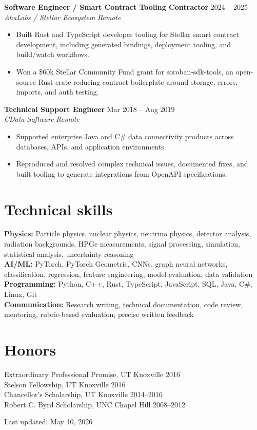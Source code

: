 \documentclass[10pt,letterpaper]{article}
\newcommand{\role}[4]{%
  \textbf{#1} \hfill #2\\
  \textit{#3} \hfill \textit{#4}\\[-2pt]
}
\begin{document}
\role{Software Engineer / Smart Contract Tooling Contractor}{2024 -- 2025}{AhaLabs / Stellar Ecosystem}{Remote}
\begin{itemize}
  \item Built Rust and TypeScript developer tooling for Stellar smart contract development, including generated bindings, deployment tooling, and build/watch workflows.
  \item Won a \$60k Stellar Community Fund grant for soroban-sdk-tools, an open-source Rust crate reducing contract boilerplate around storage, errors, imports, and auth testing.
\end{itemize}

\role{Technical Support Engineer}{Mar 2018 -- Aug 2019}{CData Software}{Remote}
\begin{itemize}
  \item Supported enterprise Java and C\# data connectivity products across databases, APIs, and application environments.
  \item Reproduced and resolved complex technical issues, documented fixes, and built tooling to generate integrations from OpenAPI specifications.
\end{itemize}

\section*{Technical skills}
\textbf{Physics:} Particle physics, nuclear physics, neutrino physics, detector analysis, radiation backgrounds, HPGe measurements, signal processing, simulation, statistical analysis, uncertainty reasoning\\
\textbf{AI/ML:} PyTorch, PyTorch Geometric, CNNs, graph neural networks, classification, regression, feature engineering, model evaluation, data validation\\
\textbf{Programming:} Python, C++, Rust, TypeScript, JavaScript, SQL, Java, C\#, Linux, Git\\
\textbf{Communication:} Research writing, technical documentation, code review, mentoring, rubric-based evaluation, precise written feedback

\section*{Honors}
Extraordinary Professional Promise, UT Knoxville \hfill 2016\\
Stelson Fellowship, UT Knoxville \hfill 2016\\
Chancellor's Scholarship, UT Knoxville \hfill 2014--2016\\
Robert C. Byrd Scholarship, UNC Chapel Hill \hfill 2008--2012

\vfill
\begin{center}
{\footnotesize Last updated: May 10, 2026}
\end{center}
\end{document}
